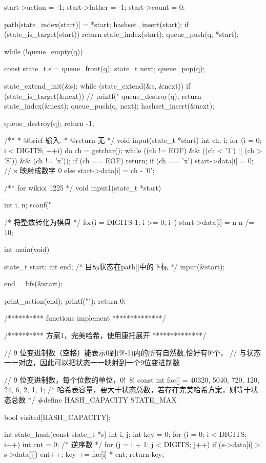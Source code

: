 \begin{Codex}[label=eight_digits_bfs.c]
{    start->action = -1;
    start->father = -1;
    start->count = 0;

    path[state_index(start)] = *start;
    hashset_insert(start);
    if (state_is_target(start))
        return state_index(start);
    queue_push(q, *start);

    while (!queue_empty(q)) {
        const state_t s = queue_front(q);
        state_t next;
        queue_pop(q);

        state_extend_init(&s);
        while (state_extend(&s, &next)) {
            if (state_is_target(&next)) {
                // printf("%
                queue_destroy(q);
                return state_index(&next);
            }
            queue_push(q, next);
            hashset_insert(&next);
        }
    }
    queue_destroy(q);
    return -1;
}

/**
 * @brief 输入.
 * @return 无
 */
void input(state_t *start) {
    int ch, i;
    for (i = 0; i < DIGITS; ++i) {
        do {
            ch = getchar();
        } while ((ch != EOF) && ((ch < '1') || (ch > '8')) && (ch != 'x'));
        if (ch == EOF) return;
        if (ch == 'x') start->data[i] = 0; // x 映射成数字 0
        else           start->data[i] = ch - '0';
    }
}

/** for wikioi 1225 */
void input1(state_t *start) {
    int i, n;
    scanf("%

    /* 将整数转化为棋盘 */
    for(i = DIGITS-1; i >= 0; i--) {
        start->data[i] = n %
        n /= 10;
    }
}

int main(void) {
    state_t start;
    int end; /* 目标状态在path[]中的下标 */
    input(&start);

    end = bfs(&start);

    print_action(end);
    printf("\n");
    return 0;
}

/********** functions implement **************/

/********** 方案1，完美哈希，使用康托展开 **************/

// 9 位变进制数（空格）能表示0到(9!-1)内的所有自然数,恰好有9!个，
// 与状态一一对应，因此可以把状态一一映射到一个9位变进制数

// 9 位变进制数，每个位数的单位，0!~8!
const int fac[] = {40320, 5040, 720, 120, 24, 6, 2, 1, 1};
/* 哈希表容量，要大于状态总数，若存在完美哈希方案，则等于状态总数 */
#define HASH_CAPACITY STATE_MAX

bool visited[HASH_CAPACITY];

int state_hash(const state_t *s) {
    int i, j;
    int key = 0;
    for (i = 0; i < DIGITS; i++) {
        int cnt = 0;  /* 逆序数 */
        for (j = i + 1; j < DIGITS; j++) if (s->data[i] > s->data[j]) cnt++;
        key += fac[i] * cnt;
    }
    return key;
}


\end{Codex}
